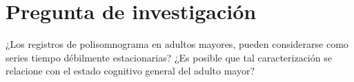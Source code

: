 




\section{Pregunta de investigación}

¿Los registros de polisomnograma en adultos mayores, pueden
considerarse como series tiempo débilmente estacionarias?
¿Es posible que tal caracterización se relacione con el estado cognitivo general del adulto mayor?


